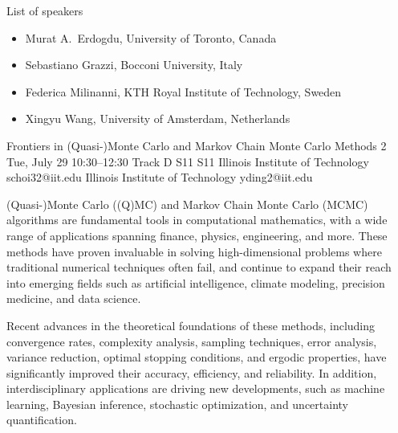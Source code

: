 \begin{talk}
\medskip

List of speakers
\begin{itemize}
    \item Murat A.~Erdogdu, University of Toronto, Canada
    \item Sebastiano Grazzi, Bocconi University, Italy
    \item Federica Milinanni, KTH Royal Institute of Technology, Sweden
    \item Xingyu Wang,  University of Amsterdam, Netherlands
\end{itemize}




\end{talk}

\begin{talk}
  {Frontiers in (Quasi-)Monte Carlo and Markov Chain Monte Carlo Methods}%
  {2}%
  {}%
  {}%
  {}%
  {}%
  {Tue, July 29 10:30–12:30 Track D}%
  {S11}%
  {S11}%
  {%
    {Illinois Institute of Technology}%
    {schoi32@iit.edu}}%
  {%
	{Illinois Institute of Technology}%
	{yding2@iit.edu}}%
  {\organizer{}%
	{}%
	{}}%


(Quasi-)Monte Carlo ((Q)MC) and Markov Chain Monte Carlo (MCMC) algorithms are fundamental tools in computational mathematics, with a wide range of applications spanning finance, physics, engineering, and more. These methods have proven invaluable in solving high-dimensional problems where traditional numerical techniques often fail, and continue to expand their reach into emerging fields such as artificial intelligence, climate modeling, precision medicine, and data science.

Recent advances in the theoretical foundations of these methods, including convergence rates, complexity analysis, sampling techniques, error analysis, variance reduction, optimal stopping conditions, and ergodic properties, have significantly improved their accuracy, efficiency, and reliability. In addition, interdisciplinary applications are driving new developments, such as machine learning, Bayesian inference, stochastic optimization, and uncertainty quantification.


\end{talk}
